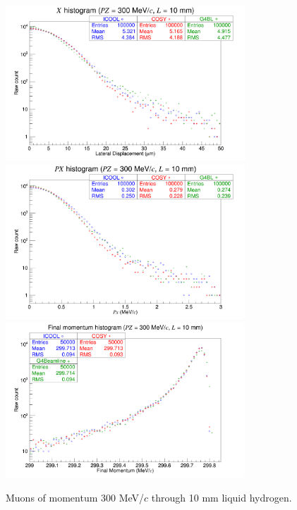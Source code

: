 \begin{figure}[!htb]
  \centering
    \includegraphics[width=0.8\textwidth]{Validation/LH/X.300.10.png} 
    \includegraphics[width=0.8\textwidth]{Validation/LH/PX.300.10.png} 
    \includegraphics[width=0.8\textwidth]{Validation/LH/strag.300.10.png} 
  \caption{Muons of momentum 300 MeV/$c$ through 10 mm liquid hydrogen.}
  \label{fig:300.10}
\end{figure}

